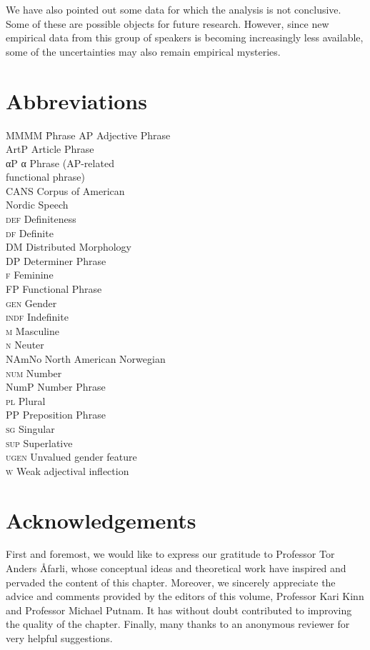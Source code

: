 \documentclass[output=paper]{langscibook}
\begin{document}
We have also pointed out some data for which the analysis is not conclusive. Some of these are possible objects for future research. However, since new empirical data from this group of speakers is becoming increasingly less available, some of the uncertainties may also remain empirical mysteries.

\section*{Abbreviations}
\begin{multicols}{2}
\begin{tabbing}
MMMM \= Phrase\kill
AP \> Adjective Phrase\\
ArtP \> Article Phrase\\
αP \> α Phrase (AP-related \\ \> functional phrase)\\
CANS \> Corpus of American \\ \> Nordic Speech\\
\textsc{def} \> Definiteness\\
\textsc{df} \> Definite\\
DM \> Distributed Morphology\\
DP \> Determiner Phrase\\
\textsc{f} \> Feminine\\
FP \> Functional Phrase\\
\textsc{gen} \> Gender\\
\textsc{indf} \> Indefinite\\
\textsc{m} \> Masculine\\
\textsc{n} \> Neuter\\
NAmNo \> North American Norwegian\\
\textsc{num} \> Number\\
NumP \> Number Phrase\\
\textsc{pl} \> Plural\\
PP \> Preposition Phrase\\
\textsc{sg} \> Singular\\
\textsc{sup} \> Superlative\\
\textsc{ugen} \> Unvalued gender feature\\
\textsc{w} \> Weak adjectival inflection
\end{tabbing}
\end{multicols}


\section*{Acknowledgements}

First and foremost, we would like to express our gratitude to Professor Tor Anders Åfarli, whose conceptual ideas and theoretical work have inspired and pervaded the content of this chapter. Moreover, we sincerely appreciate the advice and comments provided by the editors of this volume, Professor Kari Kinn and Professor Michael Putnam. It has without doubt contributed to improving the quality of the chapter. Finally, many thanks to an anonymous reviewer for very helpful suggestions.  

\printbibliography[heading=subbibliography,notkeyword=this]
\end{document}
